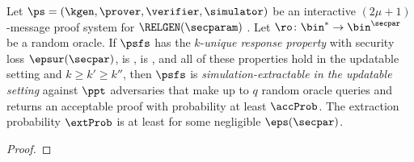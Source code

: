 
\begin{theorem}
	\label{thm:se}
	Let $\ps = (\kgen, \prover, \verifier, \simulator)$ be an interactive
	$(2 \mu + 1)$-message  proof system for $\RELGEN(\secparam)$
	. Let
	$\ro\colon \bin^{*} \to \bin^{\secpar}$ be a random oracle. If $\psfs$ has the
	$k$-\emph{unique response property} with security loss $\epsur(\secpar)$, is
	, is , and all of these properties
	hold in the updatable setting and $k \geq k' \geq k''$, then $\psfs$ is
	\emph{simulation-extractable in the updatable setting}  against $\ppt$ adversaries that make up to $q$ random oracle
	queries and returns an acceptable proof with probability at least $\accProb$.  The
	extraction probability $\extProb$ is at least
	 for some negligible $\eps(\secpar)$.
\end{theorem}

\begin{proof}
	
	\end{proof}